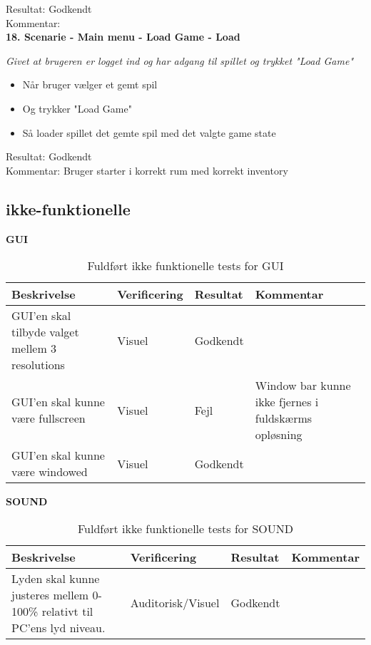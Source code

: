 Resultat: Godkendt\\
Kommentar:\\

\textbf{18. Scenarie - Main menu - Load Game - Load}

\textit{Givet at brugeren er logget ind og har adgang til spillet og trykket "Load Game"}

\begin{itemize}
  \item Når bruger vælger et gemt spil
  \item Og trykker "Load Game"
  \item Så loader spillet det gemte spil med det valgte game state
\end{itemize}

Resultat: Godkendt\\
Kommentar: Bruger starter i korrekt rum med korrekt inventory\\

\subsection{ikke-funktionelle}
\textbf{GUI}
\begin{table}[H]
\caption{ Fuldført ikke funktionelle tests for GUI}
\label{tab:}
\begin{tabular}{|p{3cm}|p{3cm}|p{3cm}|p{3cm}|}
\hline
Beskrivelse & Verificering & Resultat & Kommentar \\
\hline
GUI'en skal tilbyde valget mellem 3 resolutions & Visuel & Godkendt & \\
\hline
GUI'en skal kunne være fullscreen & Visuel & Fejl & Window bar kunne ikke fjernes i fuldskærms opløsning\\
\hline
GUI'en skal kunne være windowed & Visuel & Godkendt & \\
\hline
\end{tabular}
\end{table}

\textbf{SOUND}
\begin{table}[H]
\caption{ Fuldført ikke funktionelle tests for SOUND}
\label{tab:}
\begin{tabular}{|p{3cm}|p{3cm}|p{3cm}|p{3cm}|}
\hline
Beskrivelse & Verificering & Resultat & Kommentar \\
\hline
Lyden skal kunne justeres mellem 0-100\% relativt til PC'ens lyd niveau. & Auditorisk/Visuel & Godkendt & \\
\hline
\end{tabular}
\end{table}

